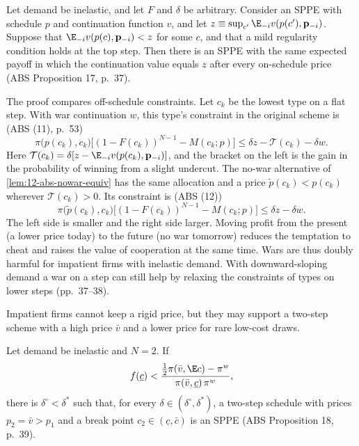 \begin{proposition}\label{prop:12-abs-impatient-nowars}
Let demand be inelastic, and let $F$ and $\delta$ be arbitrary. Consider an SPPE with schedule $p$ and continuation
function $v$, and let $z \equiv \sup_{c'}\E_{-i}v(p(c'), \mathbf p_{-i})$. Suppose that
$\E_{-i}v(p(c), \mathbf p_{-i}) < z$ for some $c$, and that a mild regularity condition holds at the top step. Then
there is an SPPE with the same expected payoff in which the continuation value equals $z$ after every on-schedule
price (ABS Proposition 17, p.~37).
\end{proposition}

The proof compares off-schedule constraints. Let $c_k$ be the lowest type on a flat step. With war continuation $w$,
this type's constraint in the original scheme is (ABS (11), p.~53)
\begin{equation*}
\pi\bigl(p(c_k), c_k\bigr)\bigl[(1 - F(c_k))^{N-1} - M(c_k; p)\bigr] \le \delta z - \mathcal T(c_k) - \delta w .
\end{equation*}
Here $\mathcal T(c_k) = \delta[z - \E_{-i}v(p(c_k), \mathbf p_{-i})]$, and the bracket on the left is the gain in
the probability of winning from a slight undercut. The no-war alternative of \cref{lem:12-abs-nowar-equiv} has the same
allocation and a price $\tilde p(c_k) < p(c_k)$ wherever $\mathcal T(c_k) > 0$. Its constraint is (ABS (12))
\begin{equation*}
\pi\bigl(\tilde p(c_k), c_k\bigr)\bigl[(1 - F(c_k))^{N-1} - M(c_k; p)\bigr] \le \delta z - \delta w .
\end{equation*}
The left side is smaller and the right side larger. Moving profit from the present (a lower price today) to the future
(no war tomorrow) reduces the temptation to cheat and raises the value of cooperation at the same time. Wars are thus
doubly harmful for impatient firms with inelastic demand. With downward-sloping demand a war on a step can still help
by relaxing the constraints of types on lower steps (pp.~37--38).

Impatient firms cannot keep a rigid price, but they may support a two-step scheme with a high price $\bar v$ and a
lower price for rare low-cost draws.

\begin{proposition}\label{prop:12-abs-escape}
Let demand be inelastic and $N = 2$. If
\begin{equation}\label{eq:12-abs-escape}
f(\underline c) < \frac{\frac{1}{2}\pi(\bar v, \E c) - \pi^w}{\pi(\bar v, \underline c)\,\pi^w},
\end{equation}
there is $\delta^\circ < \delta^*$ such that, for every $\delta \in (\delta^\circ, \delta^*)$, a two-step schedule with
prices $p_2 = \bar v > p_1$ and a break point $c_2 \in (\underline c, \bar c)$ is an SPPE (ABS Proposition 18,
p.~39).
\end{proposition}

